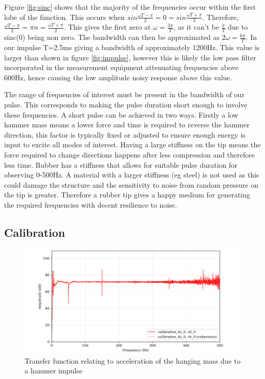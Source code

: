 \documentclass[twoside,onecolumn]{article}
\begin{document}
Figure \ref{fig:sinc} shows that the majority of the frequencies occur within the first lobe of the function. This occurs when $sin\frac{\omega T-\pi}{2}=0=sin\frac{\omega T+\pi}{2}$. Therefore, $\frac{\omega T-\pi}{2}=\pi n =\frac{\omega T+\pi}{2}$. This gives the first zero at $\omega = \frac{3\pi}{T}$, as it can't be $\frac{\pi}{T}$ due to sinc(0) being non zero. The bandwidth can then be approximated as $2\omega = \frac{6\pi}{T}$. In our impulse T=2.5ms giving a bandwidth of approximately 1200Hz. This value is larger than shown in figure \ref{fig:impulse}, however this is likely the low pass filter incorporated in the measurement equipment attenuating frequencies above 600Hz, hence causing the low amplitude noisy response above this value.
\newline

The range of frequencies of interest must be present in the bandwidth of our pulse. This corresponds to making the pulse duration short enough to involve these frequencies. A short pulse can be achieved in two ways. Firstly a low hammer mass means a lower force and time is required to reverse the hammer direction, this factor is typically fixed or adjusted to ensure enough energy is input to excite all modes of interest. Having a large stiffness on the tip means the force required to change directions happens after less compression and therefore less time. Rubber has a stiffness that allows for suitable pulse duration for observing 0-500Hz. A material with a larger stiffness (eg steel) is not used as this could damage the structure and the sensitivity to noise from random pressure on the tip is greater. Therefore a rubber tip gives a happy medium for generating the required frequencies with decent resilience to noise.
\subsection{Calibration}
\begin{figure}[h]
  \centering
    \includegraphics[width=\linewidth]{4-calibrationhit}
  \caption{Transfer function relating to acceleration of the hanging mass due to a hammer impulse}
  \label{fig:calhit}
\end{figure}
\end{document}
